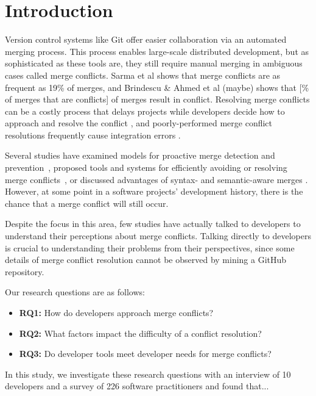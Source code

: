\section{Introduction}\label{introduction}


Version control systems like Git offer easier collaboration via an automated merging process. This process enables large-scale distributed development, but as sophisticated as these tools are, they still require manual merging in ambiguous cases called merge conflicts. Sarma et al \cite{cassandra} shows that merge conflicts are as frequent as 19\% of merges, and Brindescu \& Ahmed et al (maybe) shows that [\% of merges that are conflicts] of merges result in conflict. Resolving merge conflicts can be a costly process that delays projects while developers decide how to approach and resolve the conflict \cite{cassandra}, and poorly-performed merge conflict resolutions frequently cause integration errors \cite{bird-branches-conflict}. 

Several studies have examined models for proactive merge detection and prevention~\cite{Brun2011}\cite{palantir}\cite{Guimaraes}, proposed tools and systems for efficiently avoiding or resolving merge conflicts~\cite{nishimura}\cite{mens2002state}, or discussed advantages of syntax- and semantic-aware merges \cite{danny_refactorings}\cite{hunt2002extensible}. However, at some point in a software projects' development history, there is the chance that a merge conflict will still occur. 


Despite the focus in this area, few studies have actually talked to developers to understand their perceptions about merge conflicts. Talking directly to developers is crucial to understanding their problems from their perspectives, since some details of merge conflict resolution cannot be observed by mining a GitHub repository. 


Our research questions are as follows:
\begin{itemize}
\item\textbf{RQ1:} How do developers approach merge conflicts?\\
\item\textbf{RQ2:} What factors impact the difficulty of a conflict resolution?\\
\item\textbf{RQ3:} Do developer tools meet developer needs for merge conflicts?\\
\end{itemize}

In this study, we investigate these research questions with an interview of 10 developers and a survey of 226 software practitioners and found that...